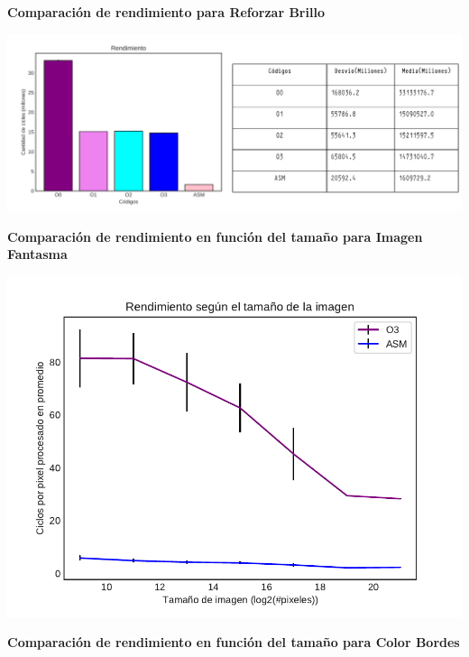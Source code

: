 \documentclass[a4paper]{article}
\begin{document}
\justify 
\begin{center}
	\textbf{Comparación de rendimiento para Reforzar Brillo}
\end{center}
\justify 
\begin{flushleft}
	\includegraphics[scale=0.55]{img/ReforzarBrilloConTabla.pdf}
\end{flushleft}


\newpage

\justify 
\begin{center}
	\textbf{Comparación de rendimiento en función del tamaño para Imagen Fantasma}	
\end{center}

\begin{center}
	\includegraphics[scale=0.6]{img/ImagenFantasmaO3vsASM.pdf}
\end{center}	


\justify 
\begin{center}
	\textbf{Comparación de rendimiento en función del tamaño para Color Bordes}
\end{center}
\end{document}
